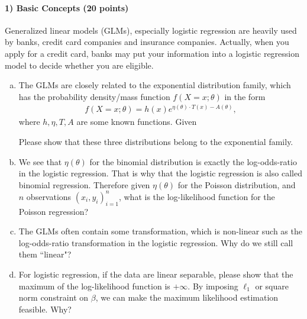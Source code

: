 \documentclass[11pt]{article}
\begin{document}
\paragraph{1) Basic Concepts (20 points)}
Generalized linear models (GLMs), especially logistic regression are heavily used by banks, credit card companies and insurance companies. Actually, when you apply for a credit card, banks may put your information into a logistic regression model to decide whether you are eligible.
\begin{enumerate}[(a)]
\item The GLMs are closely related to the exponential distribution family, which has the probability density/mass function $f(X=x; \theta)$ in the form
\begin{align}
f(X=x; \theta) = h(x)e^{\eta(\theta)\cdot T(x)-A(\theta)},
\end{align}
where $h,\eta,T,A$ are some known functions. Given 
Please show that these three distributions belong to the exponential family.

\item  We see that $\eta(\theta)$ for the binomial distribution is exactly the log-odds-ratio in the logistic regression. That is why that the logistic regression is also called binomial regression. Therefore given $\eta(\theta)$ for the Poisson distribution, and $n$ observations $(x_i, y_i)_{i=1}^n$, what is the log-likelihood function for the Poisson regression?

\item The GLMs often contain some transformation, which is non-linear such as the log-odds-ratio transformation in the logistic regression. Why do we still call them ``linear"?

\item For logistic regression, if the data are linear separable, please show that the maximum of the log-likelihood function is $+\infty$. By imposing $\ell_1$ or square norm constraint on $\beta$, we can make the maximum likelihood estimation feasible. Why?

\end{enumerate}
\end{document}
